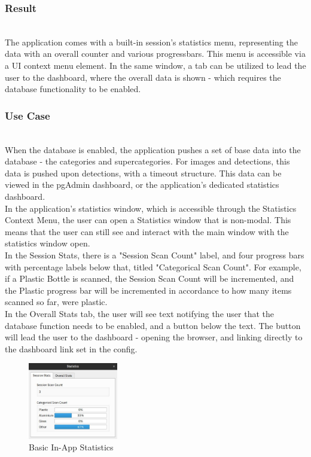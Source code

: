 \documentclass[conference]{IEEEtran}
\begin{document}
\subsubsection{Result}~\\
The application comes with a built-in session's statistics menu, representing the data with an overall counter and various progressbars. This menu is accessible via a UI context menu element. In the same window, a tab can be utilized to lead the user to the dashboard, where the overall data is shown - which requires the database functionality to be enabled.~\\

\subsubsection{Use Case}~\\
When the database is enabled, the application pushes a set of base data into the database - the categories and supercategories. For images and detections, this data is pushed upon detections, with a timeout structure. This data can be viewed in the pgAdmin dashboard, or the application's dedicated statistics dashboard. \\

In the application's statistics window, which is accessible through the Statistics Context Menu, the user can open a Statistics window that is non-modal. This means that the user can still see and interact with the main window with the statistics window open. \\

In the Session Stats, there is a "Session Scan Count" label, and four progress bars with percentage labels below that, titled "Categorical Scan Count". For example, if a Plastic Bottle is scanned, the Session Scan Count will be incremented, and the Plastic progress bar will be incremented in accordance to how many items scanned so far, were plastic.\\

In the Overall Stats tab, the user will see text notifying the user that the database function needs to be enabled, and a button below the text. The button will lead the user to the dashboard - opening the browser, and linking directly to the dashboard link set in the config.\\

\begin{figure}[!h]
    \centering
    \includegraphics[width=0.35\textwidth]{images/filled_session_stats.eps}
    \caption{Basic In-App Statistics}
\end{figure}~\\
\end{document}
